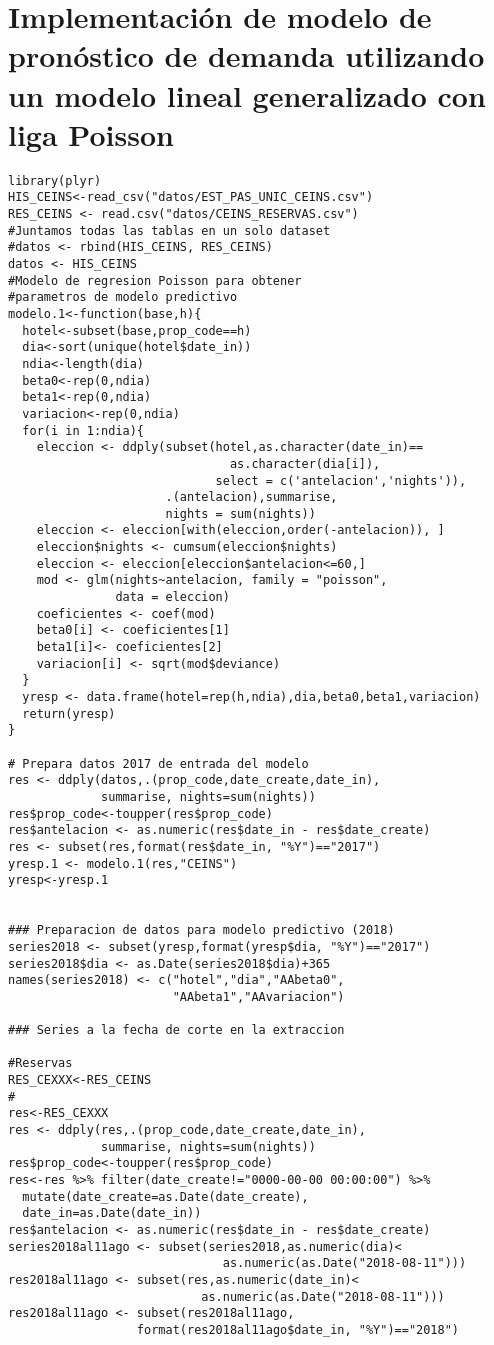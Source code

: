 \chapter{Implementación de modelo de pronóstico de demanda utilizando un modelo lineal generalizado con liga Poisson}
\label{ch:anexoa}

\begin{verbatim}
library(plyr)
HIS_CEINS<-read_csv("datos/EST_PAS_UNIC_CEINS.csv")
RES_CEINS <- read.csv("datos/CEINS_RESERVAS.csv")
#Juntamos todas las tablas en un solo dataset
#datos <- rbind(HIS_CEINS, RES_CEINS)
datos <- HIS_CEINS
#Modelo de regresion Poisson para obtener
#parametros de modelo predictivo
modelo.1<-function(base,h){
  hotel<-subset(base,prop_code==h)
  dia<-sort(unique(hotel$date_in))
  ndia<-length(dia)
  beta0<-rep(0,ndia)
  beta1<-rep(0,ndia)
  variacion<-rep(0,ndia)
  for(i in 1:ndia){
    eleccion <- ddply(subset(hotel,as.character(date_in)==
                               as.character(dia[i]),
                             select = c('antelacion','nights')),
                      .(antelacion),summarise, 
                      nights = sum(nights))
    eleccion <- eleccion[with(eleccion,order(-antelacion)), ]
    eleccion$nights <- cumsum(eleccion$nights)
    eleccion <- eleccion[eleccion$antelacion<=60,]
    mod <- glm(nights~antelacion, family = "poisson", 
               data = eleccion)
    coeficientes <- coef(mod)
    beta0[i] <- coeficientes[1]
    beta1[i]<- coeficientes[2]
    variacion[i] <- sqrt(mod$deviance)
  }
  yresp <- data.frame(hotel=rep(h,ndia),dia,beta0,beta1,variacion)
  return(yresp)
}

# Prepara datos 2017 de entrada del modelo
res <- ddply(datos,.(prop_code,date_create,date_in), 
             summarise, nights=sum(nights))
res$prop_code<-toupper(res$prop_code)
res$antelacion <- as.numeric(res$date_in - res$date_create)
res <- subset(res,format(res$date_in, "%Y")=="2017")
yresp.1 <- modelo.1(res,"CEINS")
yresp<-yresp.1


### Preparacion de datos para modelo predictivo (2018)
series2018 <- subset(yresp,format(yresp$dia, "%Y")=="2017")
series2018$dia <- as.Date(series2018$dia)+365
names(series2018) <- c("hotel","dia","AAbeta0",
                       "AAbeta1","AAvariacion")

### Series a la fecha de corte en la extraccion

#Reservas
RES_CEXXX<-RES_CEINS
#
res<-RES_CEXXX
res <- ddply(res,.(prop_code,date_create,date_in), 
             summarise, nights=sum(nights))
res$prop_code<-toupper(res$prop_code)
res<-res %>% filter(date_create!="0000-00-00 00:00:00") %>% 
  mutate(date_create=as.Date(date_create),
  date_in=as.Date(date_in))
res$antelacion <- as.numeric(res$date_in - res$date_create)
series2018al11ago <- subset(series2018,as.numeric(dia)<
                              as.numeric(as.Date("2018-08-11")))
res2018al11ago <- subset(res,as.numeric(date_in)<
                           as.numeric(as.Date("2018-08-11")))
res2018al11ago <- subset(res2018al11ago,
                  format(res2018al11ago$date_in, "%Y")=="2018")


\end{verbatim}
